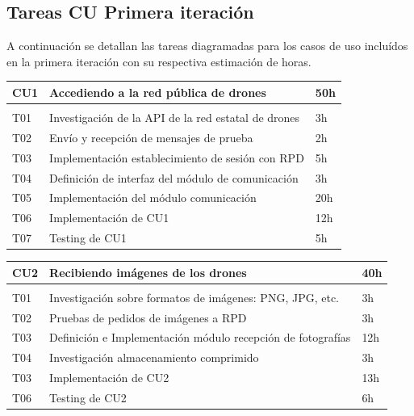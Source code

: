 \subsection{Tareas CU Primera iteración}

A continuación se detallan las tareas diagramadas para los casos de uso incluídos en la primera iteración con su respectiva estimación de horas.

\begin{table}[h!]
    \begin{tabular}{lll}
	\hline
	CU1 & Accediendo a la red pública de drones & 50h \\
	\hline \\
	T01 & Investigación de la API  de la red estatal de drones & 3h \\
	T02 & Envío y recepción de mensajes de prueba & 2h \\
	T03 & Implementación establecimiento de sesión con RPD & 5h \\
	T04 & Definición de interfaz del módulo de comunicación & 3h \\
	T05 & Implementación del módulo comunicación & 20h \\
	T06 & Implementación de CU1 & 12h \\
	T07 & Testing de CU1 & 5h \\
	\hline
    \end{tabular}
\end{table}

\begin{table}[h!]
    \begin{tabular}{lll}
	\hline
	CU2 &  Recibiendo imágenes de los drones & 40h \\
	\hline \\
	T01 & Investigación sobre formatos de imágenes: PNG, JPG, etc. & 3h \\
	T02 & Pruebas de pedidos de imágenes a RPD & 3h \\
	T03 & Definición e Implementación módulo recepción de fotografías & 12h \\
	T04 & Investigación almacenamiento comprimido & 3h \\
	T03 & Implementación de CU2 & 13h \\
	T06 & Testing de CU2 & 6h \\
	\hline
    \end{tabular}
\end{table}

\clearpage

